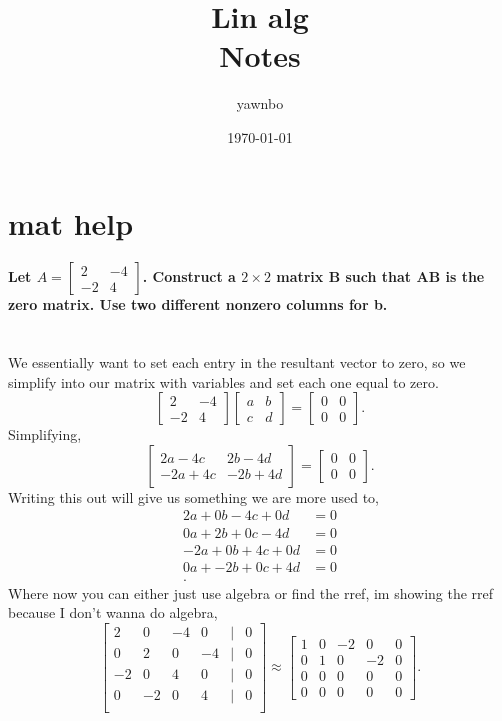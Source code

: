 \documentclass{report}
\title{\Huge{Lin alg}\\ Notes }
\author{\huge{yawnbo}}
\date{\today}
\begin{document}
\maketitle
\section{mat help}%
\label{sec: mat help }

\paragraph{Let $ A = \begin{bmatrix} 2 & -4 \\ -2 & 4 \end{bmatrix}  $. Construct a $ 2 \times 2 $ matrix B such that AB is the zero matrix. Use two different nonzero columns for b. \\ \\}
We essentially want to set each entry in the resultant vector to zero, so we simplify into our matrix with variables and set each one equal to zero. 
\[
	\begin{bmatrix} 2 & -4 \\ -2 & 4 \end{bmatrix} \begin{bmatrix} a & b \\ c & d \end{bmatrix} = \begin{bmatrix} 0 & 0 \\ 0 & 0 \end{bmatrix} 
.\] 
Simplifying,
\[
	\begin{bmatrix} 2a - 4c & 2b -4d \\ -2a + 4c & -2b +4d \end{bmatrix} = \begin{bmatrix} 0 & 0 \\ 0 & 0 \end{bmatrix}
.\] 
Writing this out will give us something we are more used to,
\begin{align*}
2a + 0b - 4c + 0d &= 0 \\
0a + 2b + 0c - 4d &= 0 \\
-2a + 0b + 4c + 0d &= 0 \\
0a + -2b + 0c + 4d &= 0 \\
.\end{align*}
Where now you can either just use algebra or find the rref, im showing the rref because I don't wanna do algebra,
\[
	\begin{bmatrix} 2 & 0 & -4 & 0 & \big| & 0 \\ 0 & 2 & 0 & -4 & \big| & 0 \\ -2 & 0 & 4 & 0 & \big| & 0 \\ 0 & -2 & 0 & 4 & \big| & 0 \\ \end{bmatrix} \approx \begin{bmatrix} 1 & 0 & -2 & 0 & 0 \\ 0 & 1 & 0 & -2 & 0 \\ 0 & 0 & 0 & 0 & 0 \\ 0 & 0 & 0 & 0 & 0 \end{bmatrix} 
.\] 
\end{document}
